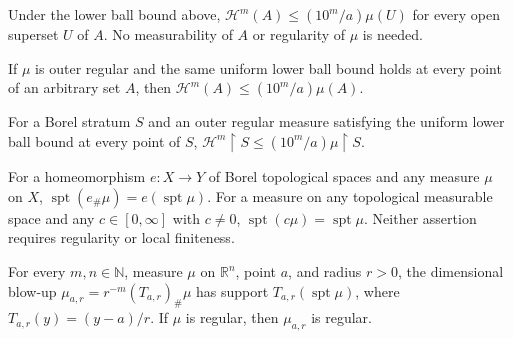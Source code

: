 \begin{lemma}
\label{lem:lower-ball-open-comparison}

Under the lower ball bound above, $\mathcal H^m(A)\leq (10^m/a)\mu(U)$ for every open superset $U$ of $A$. No measurability of $A$ or regularity of $\mu$ is needed.
\end{lemma}

\begin{lemma}
\label{lem:lower-ball-hausdorff-bound}

If $\mu$ is outer regular and the same uniform lower ball bound holds at every point of an arbitrary set $A$, then $\mathcal H^m(A)\leq (10^m/a)\mu(A)$.
\end{lemma}

\begin{lemma}
\label{lem:lower-ball-restrict-comparison}

For a Borel stratum $S$ and an outer regular measure satisfying the uniform lower ball bound at every point of $S$, $\mathcal H^m\!\restriction S\leq (10^m/a)\mu\!\restriction S$.
\end{lemma}

\begin{lemma}
\label{lem:measure-support-transport}

For a homeomorphism $e:X\to Y$ of Borel topological spaces and any measure $\mu$ on $X$, $\operatorname{spt}(e_\#\mu)=e(\operatorname{spt}\mu)$. For a measure on any topological measurable space and any $c\in[0,\infty]$ with $c\ne0$, $\operatorname{spt}(c\mu)=\operatorname{spt}\mu$. Neither assertion requires regularity or local finiteness.
\end{lemma}

\begin{lemma}
\label{lem:dimensional-blowup-support}

For every $m,n\in\mathbb N$, measure $\mu$ on $\mathbb R^n$, point $a$, and radius $r>0$, the dimensional blow-up $\mu_{a,r}=r^{-m}(T_{a,r})_\#\mu$ has support $T_{a,r}(\operatorname{spt}\mu)$, where $T_{a,r}(y)=(y-a)/r$. If $\mu$ is regular, then $\mu_{a,r}$ is regular.
\end{lemma}

